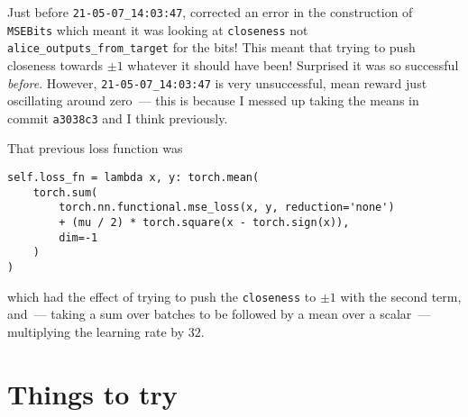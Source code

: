 \documentclass[12pt]{article}
\begin{document}
Just before \verb|21-05-07_14:03:47|, corrected an error in the construction of \texttt{MSEBits} which meant it was looking at \verb|closeness| not \verb|alice_outputs_from_target| for the bits!  This meant that trying to push closeness towards $\pm 1$ whatever it should have been!  Surprised it was so successful {\em before}.  However,  \verb|21-05-07_14:03:47| is very unsuccessful, mean reward just oscillating around zero~--- this is because I messed up taking the means in commit \verb|a3038c3| and I think previously.

That previous loss function was
\begin{lstlisting}
self.loss_fn = lambda x, y: torch.mean(
	torch.sum(
		torch.nn.functional.mse_loss(x, y, reduction='none')
		+ (mu / 2) * torch.square(x - torch.sign(x)),
		dim=-1
	)
)
\end{lstlisting}
which had the effect of trying to push the \verb|closeness| to $\pm 1$ with the second term, and~--- taking a sum over batches to be followed by a mean over a scalar~--- multiplying the learning rate by $32.$
	
\section{Things to try}
\end{document}
